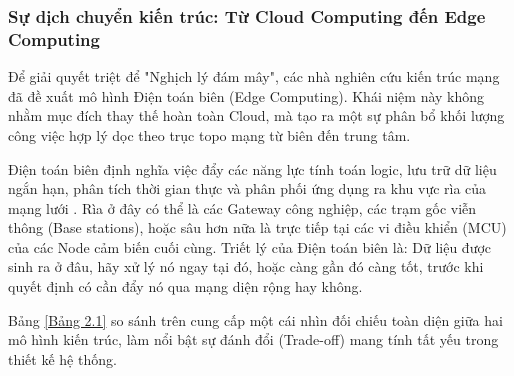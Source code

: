 \subsubsection{Sự dịch chuyển kiến trúc: Từ Cloud Computing đến Edge Computing}
Để giải quyết triệt để "Nghịch lý đám mây", các nhà nghiên cứu kiến trúc mạng đã đề xuất mô hình Điện toán biên (Edge Computing). Khái niệm này không nhằm mục đích thay thế hoàn toàn Cloud, mà tạo ra một sự phân bổ khối lượng công việc hợp lý dọc theo trục topo mạng từ biên đến trung tâm.

Điện toán biên định nghĩa việc đẩy các năng lực tính toán logic, lưu trữ dữ liệu ngắn hạn, phân tích thời gian thực và phân phối ứng dụng ra khu vực rìa của mạng lưới \cite{shi2016edge}. Rìa ở đây có thể là các Gateway công nghiệp, các trạm gốc viễn thông (Base stations), hoặc sâu hơn nữa là trực tiếp tại các vi điều khiển (MCU) của các Node cảm biến cuối cùng. Triết lý của Điện toán biên là: Dữ liệu được sinh ra ở đâu, hãy xử lý nó ngay tại đó, hoặc càng gần đó càng tốt, trước khi quyết định có cần đẩy nó qua mạng diện rộng hay không.

Bảng \ref{Bảng 2.1} so sánh trên cung cấp một cái nhìn đối chiếu toàn diện giữa hai mô hình kiến trúc, làm nổi bật sự đánh đổi (Trade-off) mang tính tất yếu trong thiết kế hệ thống. 

